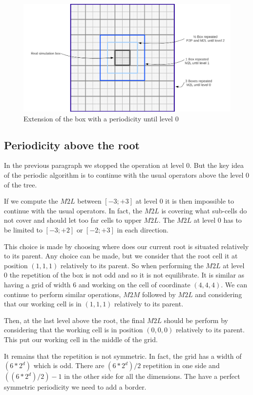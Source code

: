 \documentclass[12pt]{article} %
\begin{document}
\begin{figure}[h]
\centering
\includegraphics[scale=0.45]{Images/PeriodicL0}
\caption{Extension of the box with a periodicity until level $0$}
\end{figure}

\subsection{Periodicity above the root}
In the previous paragraph we stopped the operation at level $0$.
But the key idea of the periodic algorithm is to continue with the usual operators above the level $0$ of the tree.

If we compute the $M2L$ between $[-3;+3]$ at level $0$ it is then impossible to continue with the usual operators.
In fact, the $M2L$ is covering what sub-cells do not cover and should let too far cells to upper $M2L$.
The $M2L$ at level $0$ has to be limited to $[-3;+2]$ or $[-2;+3]$ in each direction.

This choice is made by choosing where does our current root is situated relatively to its parent.
Any choice can be made, but we consider that the root cell it at position $(1,1,1)$ relatively to its parent.
So when performing the $M2L$ at level $0$ the repetition of the box is not odd and so it is not equilibrate.
It is similar as having a grid of width $6$ and working on the cell of coordinate $(4,4,4)$.
We can continue to perform similar operations, $M2M$ followed by $M2L$ and considering that our working cell is in $(1,1,1)$ relatively to its parent.

Then, at the last level above the root, the final $M2L$ should be perform by considering that the working cell is in position $(0,0,0)$ relatively to its parent.
This put our working cell in the middle of the grid.

It remains that the repetition is not symmetric.
In fact, the grid has a width of $(6*2^d)$ which is odd.
There are $(6*2^d)/2$ repetition in one side and $((6*2^d)/2)-1$ in the other side for all the dimensions.
The have a perfect symmetric periodicity we need to add a border.
\end{document}
